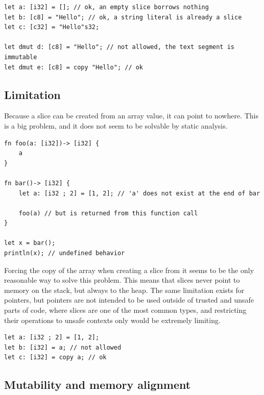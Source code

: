 \begin{lstlisting}[style=coloredverbatimError]
let a: [i32] = []; // ok, an empty slice borrows nothing
let b: [c8] = "Hello"; // ok, a string literal is already a slice
let c: [c32] = "Hello"s32;

let dmut d: [c8] = "Hello"; // not allowed, the text segment is immutable
let dmut e: [c8] = copy "Hello"; // ok
\end{lstlisting}

\subsection{Limitation}%
\label{sec:compound:slice_lim}

Because a slice can be created from an array value, it can point to nowhere.
This is a big problem, and it does not seem to be solvable by static analysis.

\begin{lstlisting}[style=coloredverbatim]
fn foo(a: [i32])-> [i32] {
    a
}

fn bar()-> [i32] {
    let a: [i32 ; 2] = [1, 2]; // 'a' does not exist at the end of bar

    foo(a) // but is returned from this function call
}

let x = bar();
println(x); // undefined behavior
\end{lstlisting}

Forcing the copy of the array when creating a slice from it seems to be the only
reasonable way to solve this problem. This means that slices never point to
memory on the stack, but always to the heap. The same limitation exists for
pointers, but pointers are not intended to be used outside of
trusted and unsafe parts of code, where slices are one of the most common types,
and restricting their operations to unsafe contexts only would be extremely
limiting.

\begin{lstlisting}[style=coloredverbatimError]
let a: [i32 ; 2] = [1, 2];
let b: [i32] = a; // not allowed
let c: [i32] = copy a; // ok
\end{lstlisting}



\subsection{Mutability and memory alignment}

